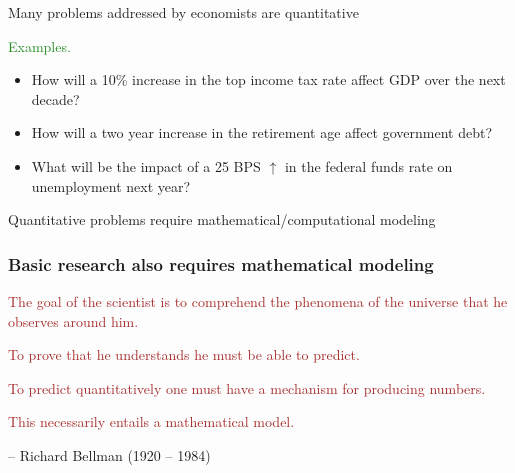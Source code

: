 \documentclass[
    xcolor={svgnames,dvipsnames},
    hyperref={colorlinks, citecolor=DeepPink4, linkcolor=DarkRed, urlcolor=DarkBlue}
    ]{beamer}  %
\newcommand{\Egs}{\textcolor{ForestGreen}{Examples. }}
\newcommand{\brown}[1]{\textcolor{Brown}{\sf #1}}
\newcommand{\1}{\mathbbm 1}
\begin{document}
\begin{frame}
    
    Many problems addressed by economists are quantitative

            \vspace{0.3em}
            \vspace{0.3em}

    \Egs 
    \begin{itemize}
        \item How will a 10\% increase in the top income tax rate affect GDP
            over the next decade?
            \vspace{0.3em}
            \vspace{0.3em}
        \item How will a two year increase in the retirement age affect
            government debt?
            \vspace{0.3em}
            \vspace{0.3em}
        \item What will be the impact of a 25 BPS $\uparrow$ in the federal
            funds rate on unemployment next year?
    \end{itemize}

            \vspace{0.3em}
            \vspace{0.3em}

    \begin{center}
        Quantitative problems require mathematical/computational modeling
    \end{center}


\end{frame}


\begin{frame}
    \frametitle{Basic research also requires mathematical modeling}

    \pause

    \brown{The goal of the scientist is to comprehend the phenomena of the
    universe that he observes around him.}

            \vspace{0.3em}
    \brown{To prove that he understands he must be able to predict.}

            \vspace{0.3em}
    \brown{To predict quantitatively one must have a mechanism for producing
    numbers.}

            \vspace{0.3em}
    \brown{This necessarily entails a mathematical model.}

            \vspace{0.3em}
            \vspace{0.3em}
            \vspace{0.3em}
     -- Richard Bellman (1920 -- 1984)

\end{frame}
\end{document}
